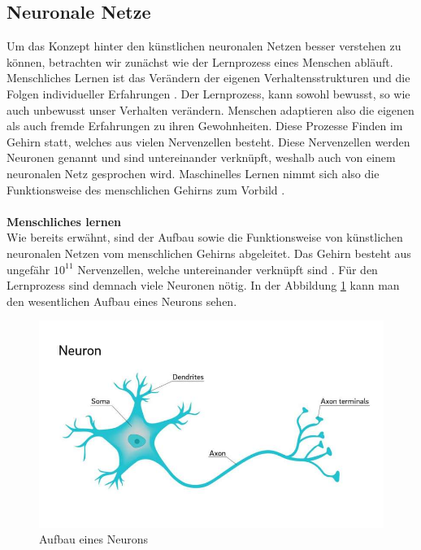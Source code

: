 \documentclass[a4paper,12pt,oneside]{article}
\begin{document}
  \subsection{Neuronale Netze}\label{s.neuronalenetze}
Um das Konzept hinter den künstlichen neuronalen Netzen besser verstehen zu können, betrachten wir zunächst wie der Lernprozess eines Menschen abläuft. Menschliches Lernen ist das Verändern der eigenen Verhaltensstrukturen und die Folgen individueller Erfahrungen \cite{hoffmann2016lern}. Der Lernprozess, kann sowohl bewusst, so wie auch unbewusst unser Verhalten verändern. Menschen adaptieren also die eigenen als auch fremde Erfahrungen zu ihren Gewohnheiten. Diese Prozesse Finden im Gehirn statt, welches aus vielen Nervenzellen besteht. Diese Nervenzellen werden Neuronen genannt und sind untereinander verknüpft, weshalb auch von einem neuronalen Netz gesprochen wird. Maschinelles Lernen nimmt sich also die Funktionsweise des menschlichen Gehirns zum Vorbild \cite[]{ertel2013grundkurs}.\\\\
\textbf{Menschliches lernen}\\
Wie bereits erwähnt, sind der Aufbau sowie die Funktionsweise von künstlichen neuronalen Netzen vom menschlichen Gehirns abgeleitet. Das Gehirn besteht aus ungefähr $10^{11}$ Nervenzellen, welche untereinander verknüpft sind \cite[265ff.]{ertel2013grundkurs}. Für den Lernprozess sind demnach viele Neuronen nötig. In der Abbildung \ref{img:neuron} kann man den wesentlichen Aufbau eines Neurons sehen.
\begin{figure}
	[h]
	\centering
	\includegraphics[scale=0.7]{Sources/neuron.jpg}
	\caption{Aufbau eines Neurons \cite{neuron2018UoC}}
	\label{img:neuron}
\end{figure}\\
\end{document}
